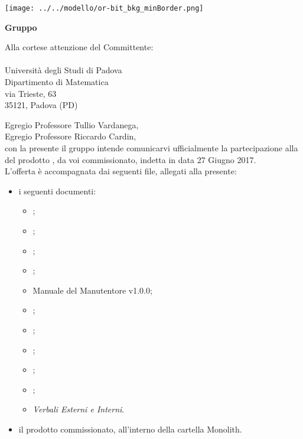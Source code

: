   
\begin{titlepage}
	
	\begin{center}
	 	
	\texttt{[image: ../../modello/or-bit\_bkg\_minBorder.png]} 
	\begin{Huge} 
	 	\textbf{Gruppo \GroupName{}}
	\end{Huge}
	\end{center}
	
	\vspace{1cm}
	\begin{large}
	\begin{flushright}
		Alla cortese attenzione del Committente: \\
		\Committente \\
		Università degli Studi di Padova \\
		Dipartimento di Matematica \\
		via Trieste, 63 \\
		35121, Padova (PD) 
		
		\vspace{0,3cm}
		
	
	\end{flushright}

	\vspace{1cm}
	
	Egregio Professore Tullio Vardanega,\\
	Egregio Professore Riccardo Cardin, \\
	
	con la presente il gruppo \GroupName{} intende comunicarvi ufficialmente la partecipazione alla \RA{} del prodotto \ProjectName{}, da voi commissionato, indetta in data 27 Giugno 2017.\\	
	
	L'offerta è accompagnata dai seguenti file, allegati alla presente: 
	\begin{itemize}
		\item i seguenti documenti:
		\begin{itemize}
			\item \AnalisiDeiRequisiti{};
			\item \DefinizioneDiProdotto{};
			\item \ManualeUtenteDemo{};
			\item \ManualeUtenteFramework{};
			\item Manuale del Manutentore v1.0.0;
			\item \Glossario{};
			\item \NormeDiProgetto{};
			\item \PianoDiProgetto{};
			\item \PianoDiQualifica{};
			\item \SpecificaTecnica{};
			\item \emph{Verbali Esterni e Interni}.
		\end{itemize}
		\item il prodotto commissionato, all'interno della cartella Monolith.
	\end{itemize}
	

\end{large}
\end{titlepage}
